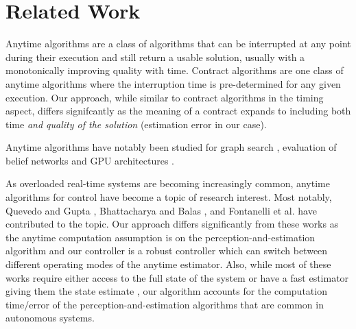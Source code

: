 \section{Related Work}
\label{related}

Anytime algorithms \cite{boddy} are a class of algorithms that can be interrupted at any point during their execution and still return a usable solution, usually with a monotonically improving quality with time. 
Contract algorithms \cite{zilbersteinAImag} are one class of anytime algorithms where the interruption time is pre-determined for any given execution. 
Our approach, while similar to contract algorithms in the timing aspect, differs signifcantly as the meaning of a contract expands to including both time \emph{and quality of the solution} (estimation error in our case).

Anytime algorithms have notably been studied for graph search \cite{maxim}, evaluation of belief networks \cite{wellman} and GPU architectures \cite{RTSSanytime}.

As overloaded real-time systems are becoming increasingly common, anytime algorithms for control have become a topic of research interest. Most notably, Quevedo and Gupta \cite{sequence}, Bhattacharya and Balas \cite{balas}, and Fontanelli et al. \cite{fontanelli} have contributed to the topic. Our approach differs significantly from these works as the anytime computation assumption is on the perception-and-estimation algorithm and our controller is a robust controller which can switch between different operating modes of the anytime estimator. Also, while most of these works require either access to the full state of the system or have a fast estimator giving them the state estimate \cite{balas}, our algorithm accounts for the computation time/error of the perception-and-estimation algorithms that are common in autonomous systems.

